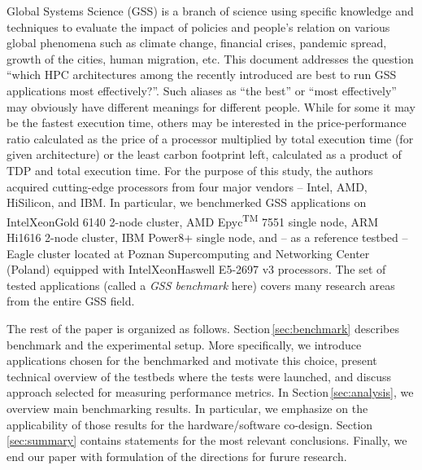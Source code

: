 Global Systems Science (GSS) is a branch of science using specific knowledge and techniques to evaluate the impact of policies and people's relation on various global phenomena such as climate change, financial crises, pandemic spread, growth of the cities, human migration, etc. This document addresses the question ``which HPC architectures among the recently introduced are best to run GSS applications most effectively?''. Such aliases as ``the best'' or ``most effectively'' may obviously have different meanings for different people. While for some it may be the fastest execution time, others may be interested in the price-performance ratio calculated as the price of a processor multiplied by total execution time (for given architecture) or the least carbon footprint left, calculated as a product of TDP and total execution time.
For the purpose of this study, the authors acquired cutting-edge processors from four major vendors -- Intel, AMD, HiSilicon, and IBM. In particular, we benchmerked GSS applications on Intel\textregistered Xeon\textregistered Gold 6140 \cite{INTELXEONGOLD6140} 2-node cluster, AMD Epyc\textsuperscript{TM} 7551 single node, ARM Hi1616 2-node cluster, IBM Power8+ \cite{IBMPOWER8} single node, and -- as a reference testbed -- Eagle cluster located at Poznan Supercomputing and Networking Center (Poland) equipped with Intel\textregistered  Xeon\textregistered Haswell E5-2697 v3 processors.
The set of tested applications (called a \textit{GSS benchmark} here) covers many research areas from the entire GSS field.

The rest of the paper is organized as follows.
Section\,\ref{sec:benchmark} describes benchmark and the experimental setup.
More specifically, we introduce applications chosen for the benchmarked and motivate this choice,
present technical overview of the testbeds where the tests were launched,
and discuss approach selected for measuring performance metrics.
In Section\,\ref{sec:analysis}, we overview main benchmarking results.
In particular, we emphasize on the applicability of those results for the hardware/software co-design.
Section\,\ref{sec:summary} contains statements for the most relevant conclusions.
Finally, we end our paper with formulation of the directions for furure research.
